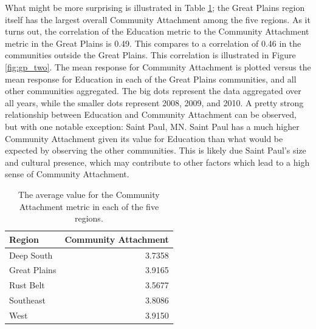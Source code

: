 \documentclass[11pt]{article}\usepackage{knitr}
\begin{document}
What might be more surprising is illustrated in Table \ref{tbl:cce_table}; the Great Plains region itself has the largest overall Community Attachment among the five regions. As it turns out, the correlation of the Education metric to the Community Attachment metric in the Great Plains is 0.49. This compares to a correlation of 0.46 in the communities outside the Great Plains. This correlation is illustrated in Figure \ref{fig:gp_two}. The mean response for Community Attachment is plotted versus the mean response for Education in each of the Great Plains communities, and all other communities aggregated. The big dots represent the data aggregated over all years, while the smaller dots represent 2008, 2009, and 2010. A pretty strong relationship between Education and Community Attachment can be observed, but with one notable exception: Saint Paul, MN. Saint Paul has a much higher Community Attachment given its value for Education than what would be expected by observing the other communities. This is likely due Saint Paul's size and cultural presence, which may contribute to other factors which lead to a high sense of Community Attachment.

\begin{table}[ht]
\centering
\begin{tabular}{lr}
  \hline
Region & Community Attachment \\ 
  \hline
Deep South & 3.7358 \\ 
  Great Plains & 3.9165 \\ 
  Rust Belt & 3.5677 \\ 
  Southeast & 3.8086 \\ 
  West & 3.9150 \\ 
   \hline
\end{tabular}
\caption{The average value for the Community Attachment metric in each of the five regions.} 
\label{tbl:cce_table}
\end{table}
\end{document}
